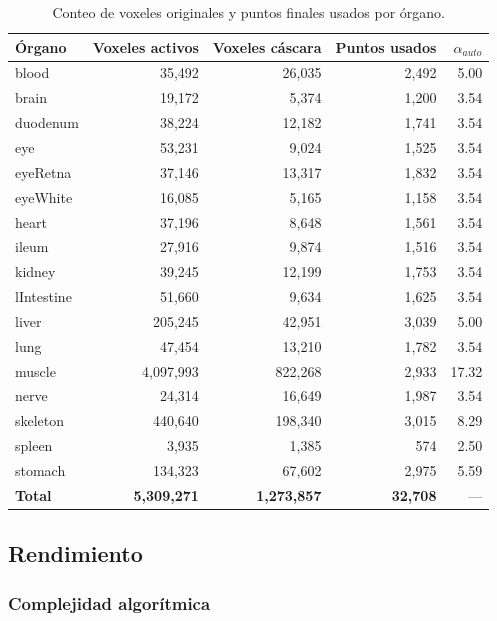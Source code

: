 \documentclass[12pt,a4paper]{article}
\begin{document}
\begin{table}[H]
\centering
\small
\caption{Conteo de voxeles originales y puntos finales usados por órgano.}
\begin{tabular}{@{}lrrrr@{}}
\toprule
\textbf{Órgano} & \textbf{Voxeles activos} & \textbf{Voxeles cáscara} & \textbf{Puntos usados} & \textbf{$\alpha_{auto}$} \\
\midrule
blood      & 35,492    & 26,035  & 2,492 & 5.00 \\
brain      & 19,172    & 5,374   & 1,200 & 3.54 \\
duodenum   & 38,224    & 12,182  & 1,741 & 3.54 \\
eye        & 53,231    & 9,024   & 1,525 & 3.54 \\
eyeRetna   & 37,146    & 13,317  & 1,832 & 3.54 \\
eyeWhite   & 16,085    & 5,165   & 1,158 & 3.54 \\
heart      & 37,196    & 8,648   & 1,561 & 3.54 \\
ileum      & 27,916    & 9,874   & 1,516 & 3.54 \\
kidney     & 39,245    & 12,199  & 1,753 & 3.54 \\
lIntestine & 51,660    & 9,634   & 1,625 & 3.54 \\
liver      & 205,245   & 42,951  & 3,039 & 5.00 \\
lung       & 47,454    & 13,210  & 1,782 & 3.54 \\
muscle     & 4,097,993 & 822,268 & 2,933 & 17.32 \\
nerve      & 24,314    & 16,649  & 1,987 & 3.54 \\
skeleton   & 440,640   & 198,340 & 3,015 & 8.29 \\
spleen     & 3,935     & 1,385   & 574   & 2.50 \\
stomach    & 134,323   & 67,602  & 2,975 & 5.59 \\
\midrule
\textbf{Total} & \textbf{5,309,271} & \textbf{1,273,857} & \textbf{32,708} & --- \\
\bottomrule
\end{tabular}
\end{table}

\subsection{Rendimiento}
\label{sec:complejidad}

\subsubsection{Complejidad algorítmica}
\end{document}

